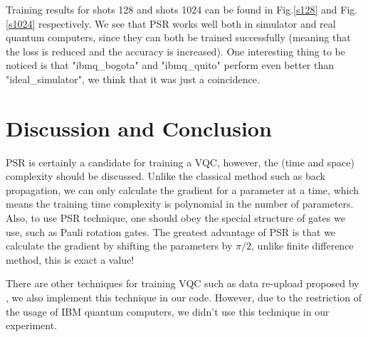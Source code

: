 \documentclass{article}
\begin{document}
Training results for shots 128 and shots 1024 can be found in Fig.\ref{s128} and Fig.\ref{s1024} respectively. We see that PSR works well both in simulator and real quantum computers, since they can both be trained successfully (meaning that the loss is reduced and the accuracy is increased). One interesting thing to be noticed is that "ibmq\_bogota" and "ibmq\_quito" perform even better than "ideal\_simulator", we think that it was just a coincidence.

\section{Discussion and Conclusion}

PSR is certainly a candidate for training a VQC, however, the (time and space) complexity should be discussed. Unlike the classical method such as back propagation, we can only calculate the gradient for a parameter at a time, which means the training time complexity is polynomial in the number of parameters. Also, to use PSR technique, one should obey the special structure of gates we use, such as Pauli rotation gates. The greatest advantage of PSR is that we calculate the gradient by shifting the parameters by $\pi/2$, unlike finite difference method, this is exact a value!

There are other techniques for training VQC such as data re-upload proposed by \citet{reupload}, we also implement this technique in our code. However, due to the restriction of the usage of IBM quantum computers, we didn't use this technique in our experiment.








\end{document}
